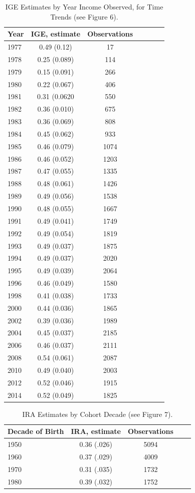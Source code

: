\documentclass[notitlepage,12pt]{article}
\begin{document}
\begin{longtable}{l|cccccc}
\caption{IGE Estimates by Year Income Observed, for Time Trends (see Figure 6).} \\ \midrule
Year & IGE, estimate          & Observations & \\
\midrule
1977 & 0.49 (0.12) & 17   \\
1978 & 0.25 (0.089) & 114  \\
1979 & 0.15 (0.091) & 266  \\
1980 & 0.22 (0.067) & 406  \\
1981 & 0.31 (0.0620 & 550  \\
1982 & 0.36 (0.010) & 675  \\
1983 & 0.36 (0.069) & 808  \\
1984 & 0.45 (0.062) & 933  \\
1985 & 0.46 (0.079) & 1074 \\
1986 & 0.46 (0.052) & 1203 \\
 1987 & 0.47  (0.055) & 1335 \\
 1988 & 0.48 (0.061) & 1426 \\
 1989 & 0.49 (0.056) & 1538 \\
 1990 & 0.48 (0.055) & 1667 \\
 1991 & 0.49 (0.041) & 1749 \\
1992 & 0.49 (0.054) & 1819 \\
1993 & 0.49 (0.037) & 1875 \\
1994 & 0.49 (0.037) & 2020 \\
1995 & 0.49 (0.039) & 2064 \\
1996 & 0.46 (0.049) & 1580 \\
1998 & 0.41 (0.038) & 1733 \\
2000 & 0.44 (0.036) & 1865 \\
2002 & 0.39 (0.036) & 1989 \\
2004 & 0.45 (0.037) & 2185 \\
2006 & 0.46 (0.037) & 2111 \\
2008 & 0.54 (0.061) & 2087 \\
2010 & 0.49 (0.040) & 2003 \\
2012 & 0.52 (0.046) & 1915 \\
2014 & 0.52 (0.049) & 1825 \\
\midrule \bottomrule
\end{longtable}

\begin{table}[H]
\centering
\caption{IRA Estimates by Cohort Decade (see Figure 7).}
\begin{tabular}{l|cccc}
\midrule
Decade of Birth & IRA, estimate          & Observations & \\
\midrule
1950 & 0.36 (.026) & 5094 &  \\
1960 & 0.37 (.029) & 4009 &  \\
1970 & 0.31  (.035) & 1732 &  \\
1980 & 0.39 (.032) & 1752 &  \\
\midrule \bottomrule
\end{tabular}
\end{table}
\end{document}
